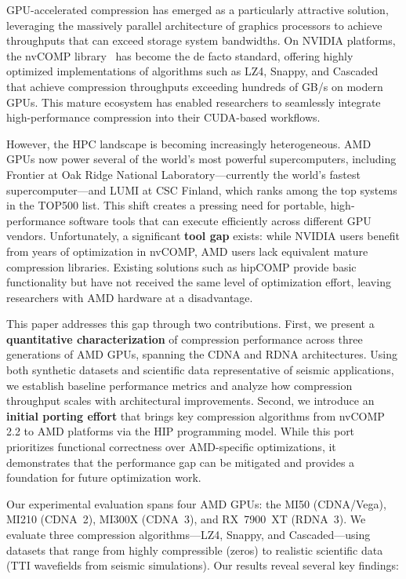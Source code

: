 \documentclass[runningheads]{llncs}
\begin{document}
GPU-accelerated compression has emerged as a particularly attractive solution, leveraging the massively parallel architecture of graphics processors to achieve throughputs that can exceed storage system bandwidths. On NVIDIA platforms, the nvCOMP library~\cite{nvcomp} has become the de facto standard, offering highly optimized implementations of algorithms such as LZ4, Snappy, and Cascaded that achieve compression throughputs exceeding hundreds of GB/s on modern GPUs. This mature ecosystem has enabled researchers to seamlessly integrate high-performance compression into their CUDA-based workflows.

However, the HPC landscape is becoming increasingly heterogeneous. AMD GPUs now power several of the world's most powerful supercomputers, including Frontier at Oak Ridge National Laboratory---currently the world's fastest supercomputer---and LUMI at CSC Finland, which ranks among the top systems in the TOP500 list. This shift creates a pressing need for portable, high-performance software tools that can execute efficiently across different GPU vendors. Unfortunately, a significant \textbf{tool gap} exists: while NVIDIA users benefit from years of optimization in nvCOMP, AMD users lack equivalent mature compression libraries. Existing solutions such as hipCOMP provide basic functionality but have not received the same level of optimization effort, leaving researchers with AMD hardware at a disadvantage.

This paper addresses this gap through two contributions. First, we present a \textbf{quantitative characterization} of compression performance across three generations of AMD GPUs, spanning the CDNA and RDNA architectures. Using both synthetic datasets and scientific data representative of seismic applications, we establish baseline performance metrics and analyze how compression throughput scales with architectural improvements. Second, we introduce an \textbf{initial porting effort} that brings key compression algorithms from nvCOMP 2.2 to AMD platforms via the HIP programming model. While this port prioritizes functional correctness over AMD-specific optimizations, it demonstrates that the performance gap can be mitigated and provides a foundation for future optimization work.

Our experimental evaluation spans four AMD GPUs: the MI50 (CDNA/Vega), MI210 (CDNA~2), MI300X (CDNA~3), and RX~7900~XT (RDNA~3). We evaluate three compression algorithms---LZ4, Snappy, and Cascaded---using datasets that range from highly compressible (zeros) to realistic scientific data (TTI wavefields from seismic simulations). Our results reveal several key findings:
\end{document}
